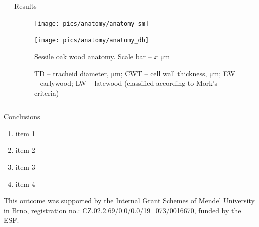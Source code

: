 \documentclass[final]{beamer}
\newlength{\sepwidth}
\newlength{\colwidth}
\newcommand{\separatorcolumn}{\begin{column}{\sepwidth}\end{column}}
\begin{document}
\begin{frame}[t]
\begin{columns}[t]
\begin{column}{\colwidth}
\end{column}


\begin{column}{\colwidth}

\begin{block}{Results}
        \begin{figure}
            \begin{minipage}{0.45\textwidth}
                \centering \texttt{[image: pics/anatomy/anatomy\_sm]}
                \caption{Spruce wood anatomy. Scale bar -- $x$ \si{\micro\meter}}
                \label{fig:anatomy_sm}
            \end{minipage}\hfill
            \begin{minipage}{0.45\textwidth}
                \centering \texttt{[image: pics/anatomy/anatomy\_db]}
                \caption{Sessile oak wood anatomy. Scale bar -- $x$ \si{\micro\meter}}
                \label{fig:anatomy_db}
            \end{minipage}\hfill
        \end{figure}
\end{block}
        \begin{figure}
            
            \caption{TD -- tracheid diameter, \si{\micro\meter}; CWT -- cell wall thickness, \si{\micro\meter}; EW -- earlywood; LW -- latewood (classified according to Mork's criteria)}
            \label{fig:xmg}
        \end{figure}

\end{column}
\end{columns}

\begin{columns}[c]
\begin{column}{0.96\paperwidth}
\begin{block}{Conclusions}
    \begin{enumerate}
        \item item 1
        \item item 2
        \item item 3
        \item item 4
    \end{enumerate}
\end{block}
\small \centering This outcome was supported by the Internal Grant Schemes of Mendel University in Brno, registration no.: CZ.02.2.69/0.0/0.0/19\_073/0016670, funded by the ESF.
\end{column}
%
%
\end{columns}
\end{frame}
\end{document}
